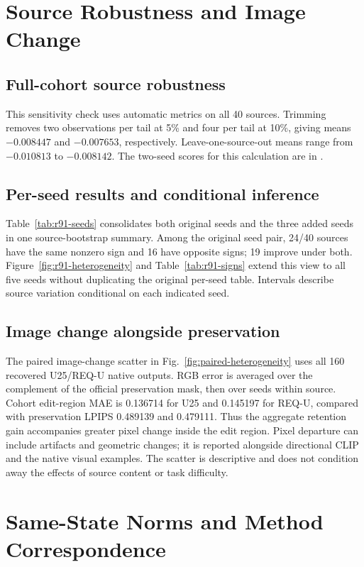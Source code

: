 \documentclass[10pt,doubleanonymous]{ieeeconf}
\begin{document}
\section{Source Robustness and Image Change}
\subsection{Full-cohort source robustness}
This sensitivity check uses automatic metrics on all 40 sources. Trimming removes two observations per tail at 5\% and four per tail at 10\%, giving means $-0.008447$ and $-0.007653$, respectively. Leave-one-source-out means range from $-0.010813$ to $-0.008142$. The two-seed scores for this calculation are in .

\subsection{Per-seed results and conditional inference}
Table~\ref{tab:r91-seeds} consolidates both original seeds and the three added seeds in one source-bootstrap summary. Among the original seed pair, 24/40 sources have the same nonzero sign and 16 have opposite signs; 19 improve under both. Figure~\ref{fig:r91-heterogeneity} and Table~\ref{tab:r91-signs} extend this view to all five seeds without duplicating the original per-seed table. Intervals describe source variation conditional on each indicated seed.

\subsection{Image change alongside preservation}
The paired image-change scatter in Fig.~\ref{fig:paired-heterogeneity} uses all 160 recovered U25/REQ-U native outputs. RGB error is averaged over the complement of the official preservation mask, then over seeds within source. Cohort edit-region MAE is 0.136714 for U25 and 0.145197 for REQ-U, compared with preservation LPIPS 0.489139 and 0.479111. Thus the aggregate retention gain accompanies greater pixel change inside the edit region. Pixel departure can include artifacts and geometric changes; it is reported alongside directional CLIP and the native visual examples. The scatter is descriptive and does not condition away the effects of source content or task difficulty.

\section{Same-State Norms and Method Correspondence}
\end{document}
